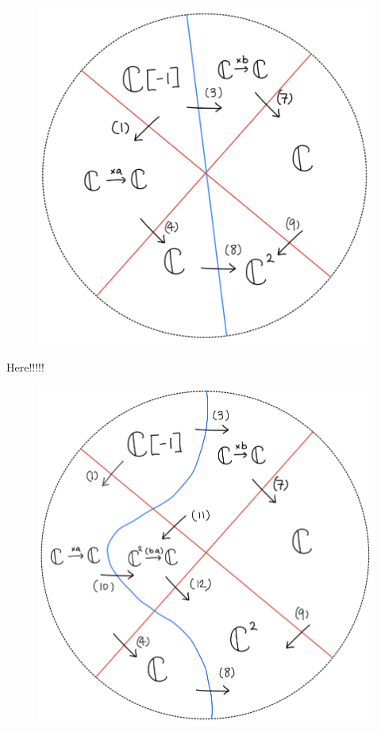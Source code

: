 \begin{figure}[H]
    \centering
    \includegraphics[scale = 0.45]{diagrams/lemma4/29.png}
    \caption{}
    \label{fig:your-label}
\end{figure}
Here!!!!!
\begin{figure}[H]
    \centering
    \includegraphics[scale = 0.45]{diagrams/lemma4/30.png}
    \caption{}
    \label{fig:your-label}
\end{figure}
